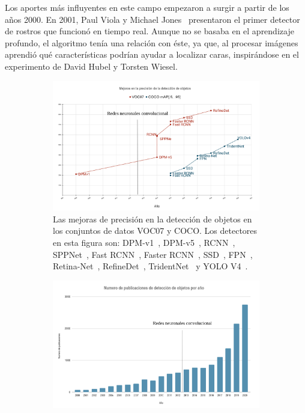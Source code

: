 Los aportes más influyentes en este campo empezaron a surgir a partir de los años 2000. En 2001, Paul Viola y Michael Jones~\cite{viola2001rapid} presentaron el primer detector de rostros que funcionó en tiempo real. Aunque no se basaba en el aprendizaje profundo, el algoritmo tenía una relación con éste, ya que, al procesar imágenes aprendió qué características podrían ayudar a localizar caras, inspirándose en el experimento de David Hubel y Torsten Wiesel. 

\begin{figure}[]
	\centering
	\begin{subfigure}{0.75\textwidth}
		\centering
		\includegraphics[width=1\textwidth]{img/evolucion_2.png}
		\caption{Las mejoras de precisión en la detección de objetos en los conjuntos de datos VOC07 y COCO. Los detectores en esta figura son: DPM-v1~\cite{felzenszwalb2008discriminatively}, DPM-v5~\cite{sadeghi201430hz}, RCNN~\cite{girshick2014rich}, SPPNet~\cite{girshick2014rich}, Fast RCNN~\cite{he2015spatial}, Faster RCNN~\cite{ren2015faster}, SSD~\cite{liu2016ssd}, FPN~\cite{lin2017feature}, Retina-Net~\cite{lin2017focal}, RefineDet~\cite{zhang2018single}, TridentNet~\cite{li2019scale} y YOLO V4~\cite{wang2020scaled}.}
		\label{fig:IoU}
	\end{subfigure}
	\centering
	\begin{subfigure}{0.75\textwidth}
		\centering
		\includegraphics[width=1\textwidth]{img/evolucion_1.png}

\end{subfigure}
\end{figure}

